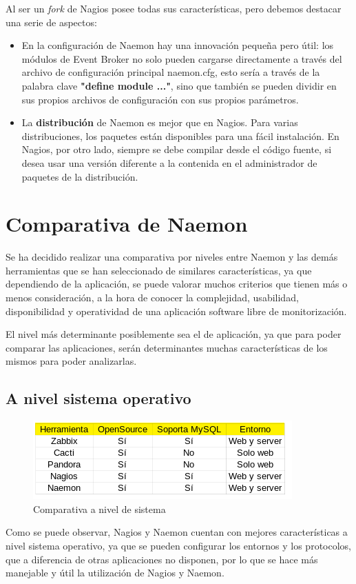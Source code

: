 Al ser un \textit{fork} de Nagios posee todas sus características, pero debemos destacar una serie de aspectos:
\begin{itemize}
	\item En la configuración de Naemon hay una innovación pequeña pero útil: los módulos de Event Broker no solo pueden cargarse directamente a través del archivo de configuración principal naemon.cfg, esto sería a través de la palabra clave \textbf{"define module {...}"}, sino que también se pueden dividir en sus propios archivos de configuración con sus propios parámetros.
	\item La \textbf{distribución} de Naemon es mejor que en Nagios. Para varias distribuciones, los paquetes están disponibles para una fácil instalación. En Nagios, por otro lado, siempre se debe compilar desde el código fuente, si desea usar una versión diferente a la contenida en el administrador de paquetes de la distribución.
\end{itemize}
\newpage
\section{Comparativa de Naemon}
Se ha decidido realizar una comparativa por niveles entre Naemon y las demás
herramientas que se han seleccionado de similares características, ya que
dependiendo de la aplicación, se puede valorar muchos criterios que tienen
más o menos consideración, a la hora de conocer la complejidad, usabilidad,
disponibilidad y operatividad de una aplicación software libre de monitorización.

El nivel más determinante posiblemente sea el de aplicación, ya que para
poder comparar las aplicaciones, serán determinantes muchas características
de los mismos para poder analizarlas.
\subsection{A nivel sistema operativo} 
\begin{figure}[H]
	\centering
	\includegraphics[scale=0.4]{imagenes/comparativanaemon.png}
	\caption{Comparativa a nivel de sistema } \label{comparativa1}
\end{figure}
Como se puede observar, Nagios y Naemon cuentan con mejores características a nivel sistema operativo, ya que se pueden configurar los entornos y los protocolos, que a diferencia de otras aplicaciones no disponen, por lo que se hace más manejable y útil la utilización de Nagios y Naemon.

